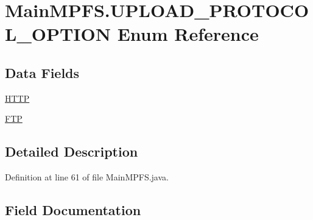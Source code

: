 \hypertarget{enum_microchip_m_p_f_s_1_1_main_m_p_f_s_1_1_u_p_l_o_a_d___p_r_o_t_o_c_o_l___o_p_t_i_o_n}{}\section{Main\+M\+P\+F\+S.\+U\+P\+L\+O\+A\+D\+\_\+\+P\+R\+O\+T\+O\+C\+O\+L\+\_\+\+O\+P\+T\+I\+O\+N Enum Reference}
\label{enum_microchip_m_p_f_s_1_1_main_m_p_f_s_1_1_u_p_l_o_a_d___p_r_o_t_o_c_o_l___o_p_t_i_o_n}
\subsection*{Data Fields}
\begin{DoxyCompactItemize}
\item 
\hyperlink{enum_microchip_m_p_f_s_1_1_main_m_p_f_s_1_1_u_p_l_o_a_d___p_r_o_t_o_c_o_l___o_p_t_i_o_n_a5bef6cce6371cc388126fd18c0173579}{H\+T\+T\+P}
\item 
\hyperlink{enum_microchip_m_p_f_s_1_1_main_m_p_f_s_1_1_u_p_l_o_a_d___p_r_o_t_o_c_o_l___o_p_t_i_o_n_a1d963cd94091bea0f4e16ced76caeb11}{F\+T\+P}
\end{DoxyCompactItemize}


\subsection{Detailed Description}


Definition at line 61 of file Main\+M\+P\+F\+S.\+java.



\subsection{Field Documentation}
\hypertarget{enum_microchip_m_p_f_s_1_1_main_m_p_f_s_1_1_u_p_l_o_a_d___p_r_o_t_o_c_o_l___o_p_t_i_o_n_a1d963cd94091bea0f4e16ced76caeb11}{}

